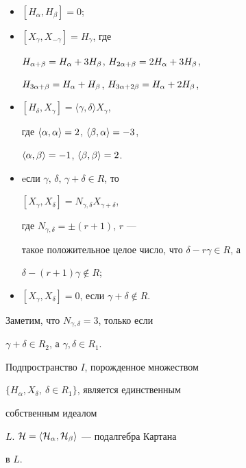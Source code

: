 \begin{itemize} 


\item[(a)] $[H_\alpha,H_\beta]=0$; 


\item[(b)] 


$[X_{\gamma},X_{-\gamma}]=H_{\gamma}$, где 


$H_{\alpha+\beta}=H_{\alpha}+3H_{\beta}$, $H_{2\alpha+\beta}=2H_{\alpha}+3H_{\beta}$, 


$H_{3\alpha+\beta}=H_{\alpha}+H_{\beta}$, $H_{3\alpha+2\beta}=H_{\alpha}+2H_{\beta}$, 


\item[(c)] 


$[H_{\delta},X_{\gamma}]=\langle \gamma,\delta\rangle X_{\gamma}$, 


где $\langle \alpha,\alpha\rangle =2$, $\langle \beta,\alpha\rangle =-3$, 


$\langle \alpha,\beta\rangle =-1$, $\langle \beta,\beta\rangle =2$. 


\item[(d)] 


eсли $\gamma,\, \delta,\, \gamma +\delta\in R$, то 


$[X_{\gamma},X_{\delta}]=N_{\gamma,\delta}X_{\gamma+\delta}$, 


где $N_{\gamma,\delta}=\pm(r+1)$, $r$ --- 


такое положительное целое число, что $\delta-r\gamma\in R$, а 


$\delta-(r+1)\gamma\notin R$; 


\item[(e)] 


$[X_{\gamma},X_{\delta}]=0$, если $\gamma+\delta\notin R$. 


\end{itemize} 


 


Заметим, что $N_{\gamma,\delta}=3$, только если 


$\gamma+\delta\in R_2$, а $\gamma,\delta\in R_1$. 


 


Подпространство $I$, порожденное множеством 


$\{H_\alpha,X_\delta,\ \delta\in R_1\}$, является единственным 


собственным идеалом 


$L$.\; $\cal H=\langle H_\alpha,H_\beta\rangle$ --- подалгебра Картана 


в $L$. 


